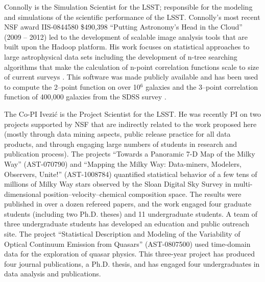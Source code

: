 Connolly is the Simulation Scientist for the LSST; responsible for the
modeling and simulations of the scientific performance of the
LSST. Connolly's most recent NSF award IIS-0844580 \$490,398 ``Putting
Astronomy's Head in the Cloud'' (2009 -- 2012) led to the development
of scalable image analysis tools that are built upon the Hadoop
platform\citep{wiley2011}. His work focuses on statistical approaches
to large astrophysical data sets including the development of n-tree
searching algorithms that make the calculation of n-point correlation
functions scale to size of current surveys \cite{Moore00}. This
software was made publicly available and has been used to compute the
2--point function on over 10$^6$ galaxies and the 3--point correlation
function of 400,000 galaxies from the SDSS survey
\cite{Scranton2002,Szapudi2002,Nichol2006,mcbride2011a,mcbride2011b}. 

The Co-PI Ivezi\'{c} is the Project Scientist for the LSST. He was
recently PI on two projects supported by NSF that are indirectly
related to the work proposed here (mostly through data mining aspects,
public release practice for all data products, and through engaging
large numbers of students in research and publication process).
The projects ``Towards a Panoramic 7-D Map of the Milky Way''
(AST-070790) and ``Mapping the Milky Way: Data-miners, Modelers,
Observers, Unite!'' (AST-1008784) quantified statistical behavior of a
few tens of millions of Milky Way stars observed by the Sloan Digital
Sky Survey in multi-dimensional position--velocity--chemical
composition space. The results were published in over a dozen refereed
papers, and the work engaged four graduate students (including two
Ph.D. theses) and 11 undergraduate students.  A team of three
undergraduate students has developed an education and public outreach
site.
The project ``Statistical Description and Modeling of the Variability
of Optical Continuum Emission from Quasars'' (AST-0807500) used
time-domain data for the exploration of quasar physics. This
three-year project has produced four journal publications, a
Ph.D. thesis, and has engaged four undergraduates in data analysis and
publications.

